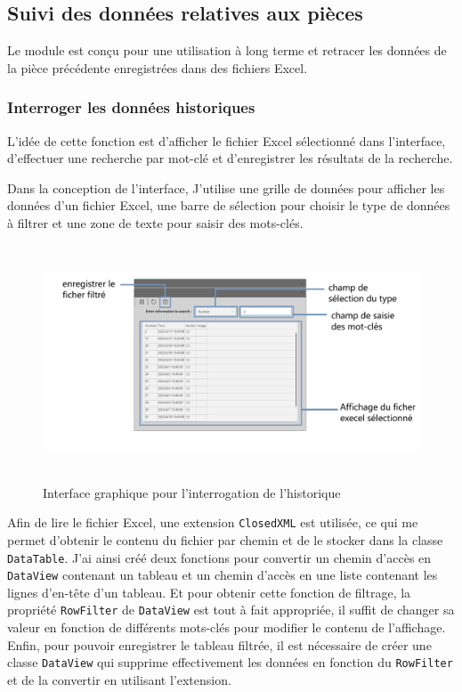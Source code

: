 \newpage
\subsection{Suivi des données relatives aux pièces}
Le module est conçu pour une utilisation à long terme et retracer les données de la pièce précédente enregistrées dans des fichiers \gls{Excel}. 

\subsubsection{Interroger les données historiques}
L'idée de cette fonction est d'afficher le fichier Excel sélectionné dans l'interface, d'effectuer une recherche par mot-clé et d'enregistrer les résultats de la recherche. 

Dans la conception de l'interface, J'utilise une grille de données pour afficher les données d'un fichier Excel, une barre de sélection pour choisir le type de données à filtrer et une zone de texte pour saisir des mots-clés. 
\begin{figure}[H]
    \centering
    \includegraphics[height=7cm]{ressources/images/information_search.png}
    \caption{Interface graphique pour l'interrogation de l'historique }
\end{figure}

Afin de lire le fichier Excel, une extension \texttt{ClosedXML} est utilisée, ce qui me permet d'obtenir le contenu du fichier par chemin et de le stocker dans la classe \texttt{DataTable}.  J'ai ainsi créé deux fonctions pour convertir un chemin d'accès en \texttt{DataView} contenant un tableau et un chemin d'accès en une liste contenant les lignes d'en-tête d'un tableau. Et pour obtenir cette fonction de filtrage, la propriété \texttt{RowFilter} de \texttt{DataView} est tout à fait appropriée, il suffit de changer sa valeur en fonction de différents mots-clés pour modifier le contenu de l'affichage. Enfin, pour pouvoir enregistrer le tableau filtrée, il est nécessaire de créer une classe \texttt{DataView} qui supprime effectivement les données en fonction du \texttt{RowFilter} et de la convertir en utilisant l'extension. 



